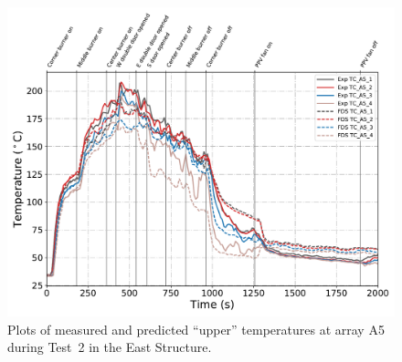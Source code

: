 

\begin{figure}[!h]
	\centering
	\includegraphics[width=\columnwidth]{Figures/Plots/Validation/Temperature/Test_2_TC_A5_upper}
	\caption{Plots of measured and predicted ``upper'' temperatures at array A5 during Test~2 in the East Structure.}
	\label{fig:TCA5_upper_data_Test2}
\end{figure}

